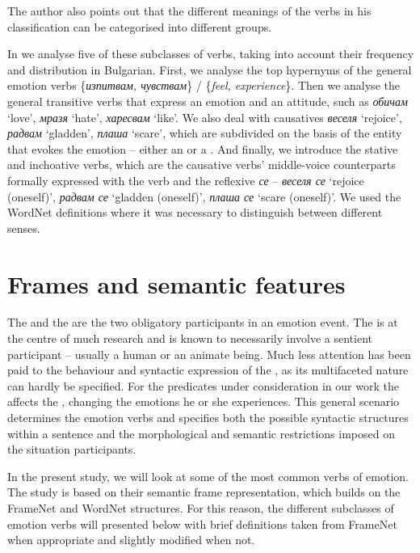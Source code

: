 \documentclass[output=paper,colorlinks,citecolor=brown]{langscibook}
\begin{document}
The author also points out that the different meanings of the verbs in his classification can be categorised into different groups.

In  we analyse five of these subclasses of verbs, taking into account their frequency and distribution in Bulgarian. First, we analyse the top hypernyms of the general emotion verbs \{\textit{изпитвам, чувствам}\} / \{\textit{feel, experience}\}. Then we analyse the general transitive verbs that express an emotion and an attitude, such as \textit{обичам} `love', \textit{мразя} `hate', \textit{харесвам} `like'. We also deal with causatives \textit{веселя} `rejoice', \textit{радвам} `gladden', \textit{плаша} `scare', which are subdivided on the basis of the entity that evokes the emotion -- either an  or a . And finally, we introduce the stative and inchoative verbs, which are the causative verbs’ middle-voice counterparts formally expressed with the verb and the reflexive \textit{се} -- \textit{веселя се} `rejoice (oneself)', \textit{радвам се} `gladden (oneself)', \textit{плаша се} `scare (oneself)'. We used the WordNet definitions where it was necessary to distinguish between different senses.



\section{Frames and semantic features}\label{ch6:sec:5}

The  and the  are the two obligatory participants in an emotion event. The  is at the centre of much research and is known to necessarily involve a sentient participant -- usually a human or an animate being. Much less attention has been paid to the behaviour and syntactic expression of the , as its multifaceted nature can hardly be specified. For the predicates under consideration in our work the   affects the , changing the emotions he or she experiences. This general scenario determines the emotion verbs and specifies both the possible syntactic structures within a sentence and the morphological and semantic restrictions imposed on the situation participants. 

In the present study, we will look at some of the most common verbs of emotion. The study is based on their semantic frame representation, which builds on the FrameNet and WordNet structures. For this reason, the different subclasses of emotion verbs will presented below with brief definitions taken from FrameNet when appropriate and slightly modified when not.
 
\end{document}
